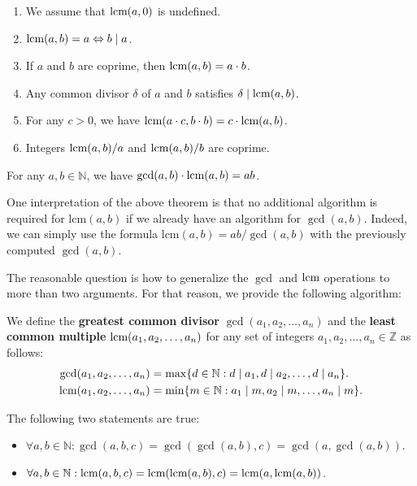 \documentclass[../lecture-notes-148x210.tex]{subfiles}
\begin{document}
\begin{lemma} 
    \hfil
    \begin{enumerate}
        \item We assume that $\text{lcm}(a, 0)$ is undefined.
        \item $\text{lcm}(a, b) = a \Leftrightarrow b \mid a$.
        \item If $a$ and $b$ are coprime, then $\text{lcm}(a, b) = a \cdot b$.
        \item Any common divisor $\delta$ of $a$ and $b$ satisfies $\delta \mid \text{lcm}(a, b)$.
        \item For any $c > 0$, we have $\text{lcm}(a \cdot c, b \cdot b) =  c \cdot \text{lcm}(a, b)$.
        \item Integers $\text{lcm}(a, b)/a$ and $\text{lcm}(a, b) / b$ are coprime.
    \end{enumerate}
\end{lemma}

\begin{theorem}
    For any $a, b \in \mathbb{N}$, we have $\text{gcd}(a, b) \cdot \text{lcm}(a, b) = ab$.
\end{theorem}

One interpretation of the above theorem is that no additional algorithm is required for
$\text{lcm}(a, b)$ if we already have an algorithm for $\gcd(a, b)$. Indeed, we
can simply use the formula $\text{lcm}(a, b) = ab / \gcd(a, b)$ with the
previously computed $\gcd(a, b)$.

The reasonable question is how to generalize the $\gcd$ and $\text{lcm}$ operations to more than two arguments. 
For that reason, we provide the following algorithm:
\begin{definition}
    We define the \textbf{greatest common divisor} $\gcd(a_1, a_2, \dots, a_n)$ and the \textbf{least common multiple} $\text{lcm}(a_1, a_2, \dots, a_n)$ for any set of integers $a_1, a_2, \dots, a_n \in \mathbb{Z}$ as follows:
    \begin{align*}
        \text{gcd}(a_1, a_2, \dots, a_n) &= \max\{ d \in \mathbb{N}: d \mid a_1, d \mid a_2, \dots, d \mid a_n \}. \\
        \text{lcm}(a_1, a_2, \dots, a_n) &= \min\{ m \in \mathbb{N}: a_1 \mid m, a_2 \mid m, \dots, a_n \mid m \}.
    \end{align*}
\end{definition}

\begin{theorem}
    The following two statements are true:
    \begin{itemize}
        \item $\forall a, b \in \mathbb{N}: \gcd(a, b, c) = \gcd(\gcd(a, b), c) = \gcd(a, \gcd(a, b))$.
        \item $\forall a, b \in \mathbb{N}: \text{lcm}(a, b, c) = \text{lcm}(\text{lcm}(a, b), c) = \text{lcm}(a, \text{lcm}(a, b))$.
    \end{itemize}
\end{theorem}
\end{document}
